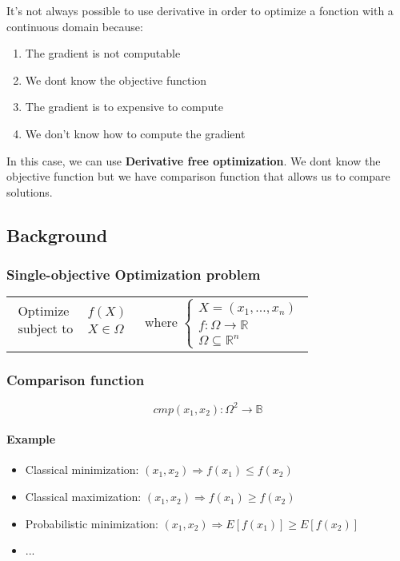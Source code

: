
It's not always possible to use derivative in order to optimize a
fonction with a continuous domain because:
\begin{enumerate}
    \item  The gradient is not computable
    \item  We dont know the objective function
    \item  The gradient is to expensive to compute
    \item  We don't know how to compute the gradient
\end{enumerate}

In this case, we can use \textbf{Derivative free optimization}.
We dont know the objective function but we have comparison function that allows us to compare solutions.


\subsection{Background}

\subsubsection{Single-objective Optimization problem}
\begin{tabular}{m{6cm}m{6cm}}
    \begin{eqnarray*}
        \textrm{Optimize } & f(X)\\
        \textrm{subject to } & X \in \Omega\\
    \end{eqnarray*}
    &
    where $ \begin{cases}
        X = (x_1, ..., x_n)\\
        f: \Omega \rightarrow \mathbb{R}\\
        \Omega \subseteq \mathbb{R}^n
    \end{cases}$
\end{tabular}

\subsubsection{Comparison function}
$$cmp(x_1, x_2) : \Omega^2 \rightarrow \mathbb{B}$$

\paragraph{Example}
\begin{itemize}
    \item Classical minimization: $(x_1, x_2) \Rightarrow f(x_1)\leq
        f(x_2)$
    \item Classical maximization: $(x_1, x_2) \Rightarrow f(x_1)\geq
        f(x_2)$
    \item Probabilistic minimization: $(x_1, x_2) \Rightarrow E[f(x_1)]\geq
        E[f(x_2)]$
    \item ...
\end{itemize}

